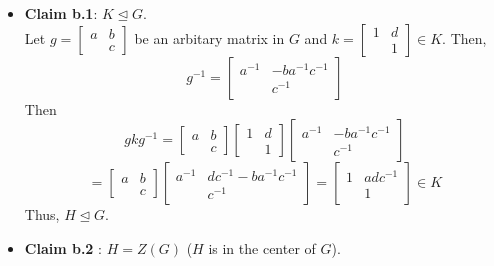 \documentclass[
]{book}
\theoremstyle{definition}
\theoremstyle{definition}
\theoremstyle{definition}
\theoremstyle{definition}
\theoremstyle{remark}
\begin{document}
\begin{itemize}
\item
  \textbf{Claim b.1}: \(K\trianglelefteq G\).\\
  Let \(g = \begin{bmatrix} a & b \\ & c \end{bmatrix}\) be an arbitary matrix in \(G\) and \(k = \begin{bmatrix} 1 & d \\ & 1 \end{bmatrix}\in K\).
  Then,
  \[ g^{-1} = \begin{bmatrix}
  a^{-1} & -ba^{-1}c^{-1} \\
  & c^{-1}
  \end{bmatrix}\]
  Then
  \[gkg^{-1} = \begin{bmatrix}
  a & b \\
  & c
  \end{bmatrix}\begin{bmatrix}
  1 & d \\
  & 1
  \end{bmatrix}\begin{bmatrix}
  a^{-1} & -ba^{-1}c^{-1} \\
  & c^{-1}
  \end{bmatrix}\]
  \[= \begin{bmatrix}
  a & b \\
  & c
  \end{bmatrix}\begin{bmatrix}
  a^{-1} & dc^{-1} - ba^{-1}c^{-1} \\
  & c^{-1}
  \end{bmatrix} = \begin{bmatrix}
  1 & adc^{-1} \\
  & 1
  \end{bmatrix} \in K\]
  Thus, \(H\trianglelefteq G\).
\item
  \textbf{Claim b.2} : \(H=Z(G)\) (\(H\) is in the center of \(G\)).


\end{itemize}
\end{document}
